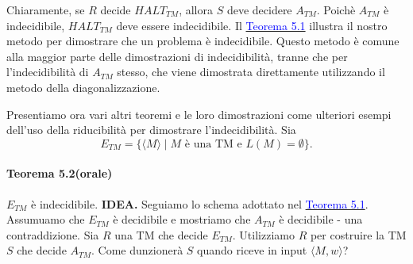 \documentclass{article}
\begin{document}
Chiaramente, se $R$ decide $HALT_{TM}$, allora $S$ deve decidere $A_{TM}$.
Poichè $A_{TM}$ è indecidibile, $HALT_{TM}$ deve essere indecidibile.
\vspace{1em}
\text{}
\newline
Il \hyperref[teorema-5.1]{\textcolor{blue}{Teorema 5.1}} illustra il nostro metodo per dimostrare che un problema è indecidibile.
Questo metodo è comune alla maggior parte delle dimostrazioni di indecidibilità, tranne che per l'indecidibilità di $A_{TM}$ stesso, che viene dimostrata direttamente utilizzando il metodo della diagonalizzazione.

Presentiamo ora vari altri teoremi e le loro dimostrazioni come ulteriori esempi dell'uso della riducibilità per dimostrare l'indecidibilità.
Sia
$$
E_{TM} = \{\langle M \rangle \mid M \text{ è una TM e } L(M) = \emptyset \}.
$$
\paragraph{Teorema 5.2(orale)}
\label{teorema-5.2}
\text{}
\newline
$E_{TM}$ è indecidibile.
\vspace{1em}
\text{}
\newline
\hbox{\textbf{IDEA.}}
Seguiamo lo schema adottato nel \hyperref[teorema-5.1]{\textcolor{blue}{Teorema 5.1}}.
Assumuamo che $E_{TM}$ è decidibile e mostriamo che $A_{TM}$ è decidibile - una contraddizione.
Sia $R$ una TM che decide $E_{TM}$.
Utilizziamo $R$ per costruire la TM $S$ che decide $A_{TM}$.
Come dunzionerà $S$ quando riceve in input $\langle M,w \rangle$?
\end{document}
